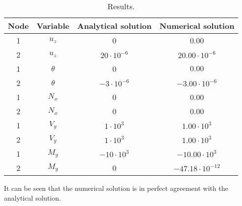 \documentclass[a4]{article}
\begin{document}
\begin{table}[h!]
	\begin{center}
		\begin{tabular}{|*{4}{c}|}
			\hline
			Node & Variable & Analytical solution & Numerical solution \\
			\hline
			1 & $u_z$ & 0 & 0.00\\
			\hline
			2 & $u_z$ & $ 20\cdot 10^{-6} $ & $ 20.00\cdot 10^{-6} $\\
			\hline
			1 & $\theta$ & 0 & $0.00$ \\
			\hline
			2 & $\theta$ & $ -3\cdot 10^{-6} $ & $-3.00\cdot 10^{-6}$ \\
			\hline
			1 & $N_{x}$ & 0 & 0.00 \\
			\hline
			2 & $N_{x}$ & 0 & 0.00 \\
			\hline
			1 & $V_{y}$ & $ 1\cdot 10^{3} $ & $ 1.00\cdot 10^{3} $ \\
			\hline
			2 & $V_{y}$ &$ 1\cdot 10^{3} $ & $ 1.00\cdot 10^{3} $ \\
			\hline
			1 & $M_{y}$ & $ -10\cdot 10^{3} $ & $-10.00\cdot 10^{3}$ \\
			\hline
			2 & $M_{y}$ & 0 & $-47.18\cdot 10^{-12}$ \\
			\hline
		\end{tabular}
	\end{center}
	\caption{Results.}
	\label{tab:beam_results}
\end{table}

It can be seen that the numerical solution is in perfect agreement with the analytical solution.
\end{document}
